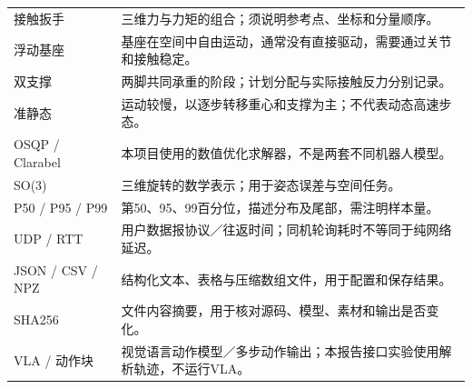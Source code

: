 \begin{longtable}{p{.20\linewidth}p{.70\linewidth}}
接触扳手 & 三维力与力矩的组合；须说明参考点、坐标和分量顺序。\\
浮动基座 & 基座在空间中自由运动，通常没有直接驱动，需要通过关节和接触稳定。\\
双支撑 & 两脚共同承重的阶段；计划分配与实际接触反力分别记录。\\
准静态 & 运动较慢，以逐步转移重心和支撑为主；不代表动态高速步态。\\
OSQP / Clarabel & 本项目使用的数值优化求解器，不是两套不同机器人模型。\\
SO(3) & 三维旋转的数学表示；用于姿态误差与空间任务。\\
P50 / P95 / P99 & 第50、95、99百分位，描述分布及尾部，需注明样本量。\\
UDP / RTT & 用户数据报协议／往返时间；同机轮询耗时不等同于纯网络延迟。\\
JSON / CSV / NPZ & 结构化文本、表格与压缩数组文件，用于配置和保存结果。\\
SHA256 & 文件内容摘要，用于核对源码、模型、素材和输出是否变化。\\
VLA / 动作块 & 视觉语言动作模型／多步动作输出；本报告接口实验使用解析轨迹，不运行VLA。\\
\bottomrule\end{longtable}
